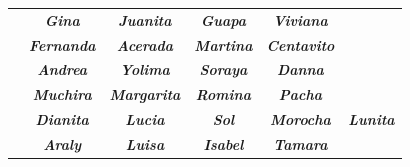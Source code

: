 \begin{table}[H]
{\begin{tabular}{|c|ccccc|}
\cellcolor[HTML]{1122C6}{\color[HTML]{FFFFFF} } &
  \multicolumn{1}{c|}{\cellcolor[HTML]{A3E1F3}\textit{\textbf{Gina}}} &
  \multicolumn{1}{c|}{\cellcolor[HTML]{A3E1F3}\textit{\textbf{Juanita}}} &
  \multicolumn{1}{c|}{\cellcolor[HTML]{A3E1F3}\textit{\textbf{Guapa}}} &
  \multicolumn{1}{c|}{\cellcolor[HTML]{A3E1F3}\textit{\textbf{Viviana}}} &
  \textit{\textbf{}} \\ \cline{2-6} 
\rowcolor[HTML]{A3E1F3} 
\cellcolor[HTML]{1122C6}{\color[HTML]{FFFFFF} } &
  \multicolumn{1}{c|}{\cellcolor[HTML]{A3E1F3}\textit{\textbf{Fernanda}}} &
  \multicolumn{1}{c|}{\cellcolor[HTML]{A3E1F3}\textit{\textbf{Acerada}}} &
  \multicolumn{1}{c|}{\cellcolor[HTML]{A3E1F3}\textit{\textbf{Martina}}} &
  \multicolumn{1}{c|}{\cellcolor[HTML]{A3E1F3}\textit{\textbf{Centavito}}} &
  \textit{\textbf{}} \\ \cline{2-6} 
\rowcolor[HTML]{A3E1F3} 
\cellcolor[HTML]{1122C6}{\color[HTML]{FFFFFF} } &
  \multicolumn{1}{c|}{\cellcolor[HTML]{A3E1F3}\textit{\textbf{Andrea}}} &
  \multicolumn{1}{c|}{\cellcolor[HTML]{A3E1F3}\textit{\textbf{Yolima}}} &
  \multicolumn{1}{c|}{\cellcolor[HTML]{A3E1F3}\textit{\textbf{Soraya}}} &
  \multicolumn{1}{c|}{\cellcolor[HTML]{A3E1F3}\textit{\textbf{Danna}}} &
  \textit{\textbf{}} \\ \cline{2-6} 
\rowcolor[HTML]{A3E1F3} 
\cellcolor[HTML]{1122C6}{\color[HTML]{FFFFFF} } &
  \multicolumn{1}{c|}{\cellcolor[HTML]{A3E1F3}\textit{\textbf{Muchira}}} &
  \multicolumn{1}{c|}{\cellcolor[HTML]{A3E1F3}\textit{\textbf{Margarita}}} &
  \multicolumn{1}{c|}{\cellcolor[HTML]{A3E1F3}\textit{\textbf{Romina}}} &
  \multicolumn{1}{c|}{\cellcolor[HTML]{A3E1F3}\textit{\textbf{Pacha}}} &
  \textit{\textbf{}} \\ \cline{2-6} 
\rowcolor[HTML]{A3E1F3} 
\cellcolor[HTML]{1122C6}{\color[HTML]{FFFFFF} } &
  \multicolumn{1}{c|}{\cellcolor[HTML]{A3E1F3}\textit{\textbf{Dianita}}} &
  \multicolumn{1}{c|}{\cellcolor[HTML]{A3E1F3}\textit{\textbf{Lucia}}} &
  \multicolumn{1}{c|}{\cellcolor[HTML]{A3E1F3}\textit{\textbf{Sol}}} &
  \multicolumn{1}{c|}{\cellcolor[HTML]{A3E1F3}\textit{\textbf{Morocha}}} &
  \textit{\textbf{Lunita}} \\ \cline{2-6} 
\rowcolor[HTML]{A3E1F3} 
\multirow{-6}{*}{\cellcolor[HTML]{1122C6}{\color[HTML]{FFFFFF} \textit{\textbf{2}}}} &
  \multicolumn{1}{c|}{\cellcolor[HTML]{A3E1F3}\textit{\textbf{Araly}}} &
  \multicolumn{1}{c|}{\cellcolor[HTML]{A3E1F3}\textit{\textbf{Luisa}}} &
  \multicolumn{1}{c|}{\cellcolor[HTML]{A3E1F3}\textit{\textbf{Isabel}}} &
  \multicolumn{1}{c|}{\cellcolor[HTML]{A3E1F3}\textit{\textbf{Tamara}}} &

\end{tabular}}
\end{table}
